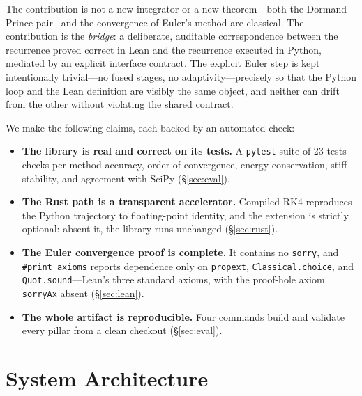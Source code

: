 \documentclass[sigplan,nonacm,screen]{acmart}
\begin{document}
The contribution is not a new integrator or a new theorem---both the
Dormand--Prince pair~\cite{dormandprince1980} and the convergence of Euler's
method are classical. The contribution is the \emph{bridge}: a deliberate,
auditable correspondence between the recurrence proved correct in Lean and the
recurrence executed in Python, mediated by an explicit interface contract. The
explicit Euler step is kept intentionally trivial---no fused stages, no
adaptivity---precisely so that the Python loop and the Lean definition are
visibly the same object, and neither can drift from the other without violating
the shared contract.

We make the following claims, each backed by an automated check:
\begin{itemize}
\item \textbf{The library is real and correct on its tests.} A \texttt{pytest}
suite of 23 tests checks per-method accuracy, order of convergence, energy
conservation, stiff stability, and agreement with SciPy
(\S\ref{sec:eval}).
\item \textbf{The Rust path is a transparent accelerator.} Compiled RK4
reproduces the Python trajectory to floating-point identity, and the extension
is strictly optional: absent it, the library runs unchanged
(\S\ref{sec:rust}).
\item \textbf{The Euler convergence proof is complete.} It contains no
\texttt{sorry}, and \texttt{\#print axioms} reports dependence only on
\texttt{propext}, \texttt{Classical.choice}, and \texttt{Quot.sound}---Lean's
three standard axioms, with the proof-hole axiom \texttt{sorryAx} absent
(\S\ref{sec:lean}).
\item \textbf{The whole artifact is reproducible.} Four commands build and
validate every pillar from a clean checkout (\S\ref{sec:eval}).
\end{itemize}

\section{System Architecture}
\label{sec:arch}
\end{document}
